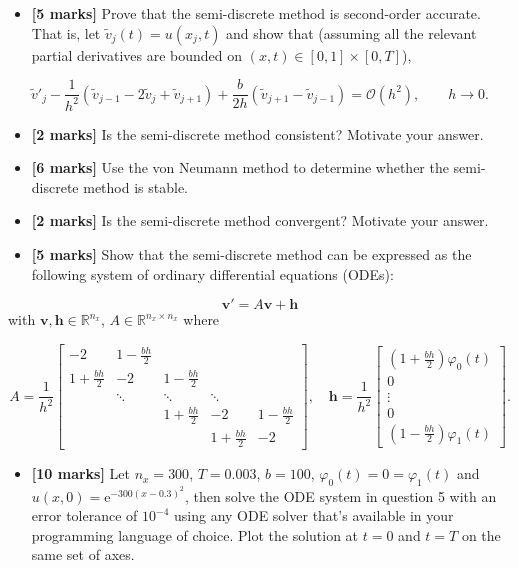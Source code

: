 \documentclass[12pt,a4paper]{article}
\begin{document}
\begin{itemize}
\item[5. ] \textbf{[5 marks]} Prove that the semi-discrete method is second-order accurate.  That is, let $\widetilde{v}_j(t) = u(x_j,t)$ and show that (assuming all the relevant partial derivatives are bounded on $(x,t) \in [0, 1]\times [0, T]$),

\end{itemize}
\[
    \widetilde{v}'_j - \frac{1}{h^2}\left(\widetilde{v}_{j-1} - 2\widetilde{v}_j + \widetilde{v}_{j+1}   \right) + \frac{b}{2h}\left(\widetilde{v}_{j+1}  - \widetilde{v}_{j-1}   \right) = \mathcal{O}\left(h^2 \right), \qquad h \to 0.
\]
\begin{itemize}
\item[6. ] \textbf{[2 marks]} Is the semi-discrete method consistent?  Motivate your answer.


\item[7. ] \textbf{[6 marks]} Use the von Neumann method to determine whether the semi-discrete method is stable.


\item[8. ] \textbf{[2 marks]} Is the semi-discrete method convergent?  Motivate your answer.


\item[9. ] \textbf{[5 marks]} Show that the semi-discrete method can be expressed as the following system of ordinary differential equations (ODEs):

\end{itemize}
\[
\mathbf{v}' = A\mathbf{v} + \mathbf{h}
\]
with $\mathbf{v}, \mathbf{h} \in \mathbb{R}^{n_x}$, $A \in \mathbb{R}^{n_x \times n_x}$ where

\[
 A = \frac{1}{h^2}\begin{bmatrix}
-2 & 1 - \frac{bh}{2} & & & \\
1 + \frac{bh}{2}  & -2 & 1 - \frac{bh}{2}  & & \\
      & \ddots & \ddots & \ddots & \\
      &        & 1 + \frac{bh}{2}    & -2 & 1 - \frac{bh}{2} \\
      &        &        &1 + \frac{bh}{2}      & -2
\end{bmatrix}, \quad
\mathbf{h} = \frac{1}{h^2}\left[\begin{array}{c} 
{} \left(1 + \frac{bh}{2}\right)\varphi_0(t)\\
0 \\
\vdots \\
0 \\
\left(1 - \frac{bh}{2}\right)\varphi_1(t)
\end{array}
\right].
\]
\begin{itemize}
\item[6. ] \textbf{[10 marks]} Let $n_x = 300$, $T = 0.003$, $b = 100$, $\varphi_0(t) = 0 = \varphi_1(t)$ and $u(x,0) = \mathrm{e}^{-300(x-0.3)^2}$, then solve the ODE system in question 5 with an error tolerance of $10^{-4}$ using any ODE solver that's available in your programming language of choice.  Plot the solution at $t = 0$ and $t = T$ on the same set of axes.

\end{itemize}
\end{document}
